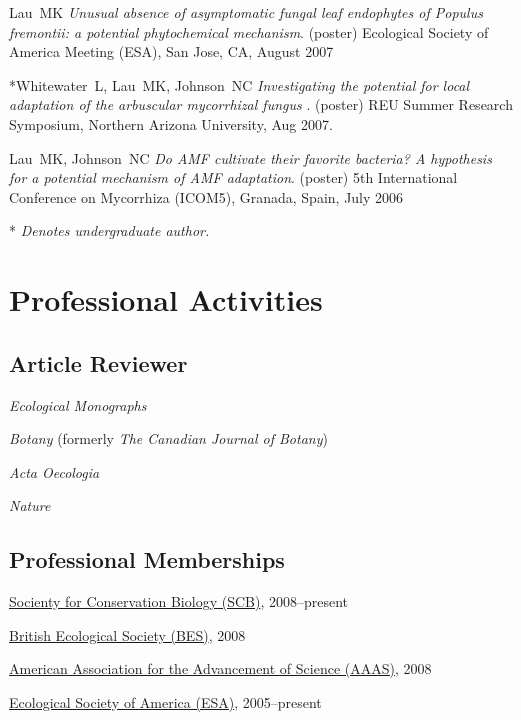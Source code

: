 \documentclass[letterpaper]{article}
\renewenvironment{itemize}{
  \begin{list}{}{
    \setlength{\leftmargin}{1em}
  }
}{
  \end{list}
}
\begin{document}
\begin{itemize}
\item Lau\ MK \textit{Unusual absence of asymptomatic fungal leaf endophytes of 
Populus fremontii: a potential phytochemical mechanism}. (poster) Ecological Society of America Meeting (ESA), San Jose, CA, August 2007

\item \mbox{*}Whitewater\ L, Lau\ MK, Johnson\ NC \textit{Investigating the
  potential for local adaptation of the arbuscular mycorrhizal fungus}
  . (poster) REU Summer Research
  Symposium, Northern Arizona University, Aug 2007.

\item Lau\ MK, Johnson\ NC \textit{Do AMF cultivate their favorite bacteria? A hypothesis for a 
potential mechanism of AMF adaptation}. (poster) 5th International Conference on Mycorrhiza (ICOM5), Granada, Spain, July 2006

\mbox{*} \textit{Denotes undergraduate author.}

\end{itemize}


\section*{Professional Activities}

\subsection*{Article Reviewer}
\begin{itemize}
\item \textit{Ecological Monographs} 
\item \textit{Botany} (formerly \textit{The Canadian Journal of Botany}) 
\item \textit{Acta Oecologia} 
\item \textit{Nature} 
\end{itemize}

\subsection*{Professional Memberships}

\begin{itemize}
\item \href{http://www.conbio.org/}{Socienty for Conservation Biology (SCB)}, 2008--present
\item \href{http://www.aaas.org/}{British Ecological Society (BES)}, 2008
\item \href{http://www.aaas.org/}{American Association for the Advancement of Science (AAAS)}, 2008
\item \href{http://www.esa.org/}{Ecological Society of America (ESA)}, 2005--present
\end{itemize}
\end{document}
